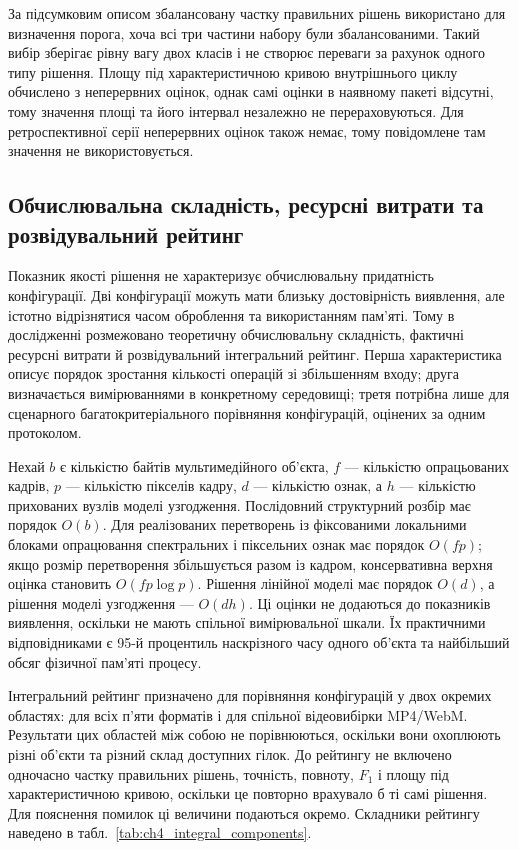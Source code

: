 За підсумковим описом збалансовану частку правильних рішень використано для визначення порога, хоча всі три частини набору були збалансованими. Такий вибір зберігає рівну вагу двох класів і не створює переваги за рахунок одного типу рішення. Площу під характеристичною кривою внутрішнього циклу обчислено з неперервних оцінок, однак самі оцінки в наявному пакеті відсутні, тому значення площі та його інтервал незалежно не перераховуються. Для ретроспективної серії неперервних оцінок також немає, тому повідомлене там значення не використовується.

\subsection{Обчислювальна складність, ресурсні витрати та розвідувальний рейтинг}

Показник якості рішення не характеризує обчислювальну придатність конфігурації. Дві конфігурації можуть мати близьку достовірність виявлення, але істотно відрізнятися часом оброблення та використанням пам’яті. Тому в дослідженні розмежовано теоретичну обчислювальну складність, фактичні ресурсні витрати й розвідувальний інтегральний рейтинг. Перша характеристика описує порядок зростання кількості операцій зі збільшенням входу; друга визначається вимірюваннями в конкретному середовищі; третя потрібна лише для сценарного багатокритеріального порівняння конфігурацій, оцінених за одним протоколом.

Нехай $b$ є кількістю байтів мультимедійного об’єкта, $f$ --- кількістю опрацьованих кадрів, $p$ --- кількістю пікселів кадру, $d$ --- кількістю ознак, а $h$ --- кількістю прихованих вузлів моделі узгодження. Послідовний структурний розбір має порядок $O(b)$. Для реалізованих перетворень із фіксованими локальними блоками опрацювання спектральних і піксельних ознак має порядок $O(fp)$; якщо розмір перетворення збільшується разом із кадром, консервативна верхня оцінка становить $O(fp\log p)$. Рішення лінійної моделі має порядок $O(d)$, а рішення моделі узгодження --- $O(dh)$. Ці оцінки не додаються до показників виявлення, оскільки не мають спільної вимірювальної шкали. Їх практичними відповідниками є 95-й процентиль наскрізного часу одного об’єкта та найбільший обсяг фізичної пам’яті процесу.

Інтегральний рейтинг призначено для порівняння конфігурацій у двох окремих областях: для всіх п’яти форматів і для спільної відеовибірки MP4/WebM. Результати цих областей між собою не порівнюються, оскільки вони охоплюють різні об’єкти та різний склад доступних гілок. До рейтингу не включено одночасно частку правильних рішень, точність, повноту, $F_1$ і площу під характеристичною кривою, оскільки це повторно врахувало б ті самі рішення. Для пояснення помилок ці величини подаються окремо. Складники рейтингу наведено в табл.~\ref{tab:ch4_integral_components}.


